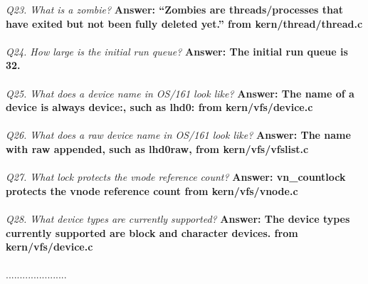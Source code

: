 \documentclass[11pt, english]{article}
\begin{document}
\textit{Q23. What is a zombie?}\newline
\textbf{Answer: “Zombies are threads/processes that have exited but not been fully deleted yet.”
	from kern/thread/thread.c
	}\\ \\
\textit{Q24. How large is the initial run queue?}\newline
\textbf{Answer: The initial run queue is 32.}\\ \\
\textit{Q25. What does a device name in OS/161 look like?}\newline
\textbf{Answer: The name of a device is always device:, such as lhd0:
	from kern/vfs/device.c
	}\\ \\
\textit{Q26. What does a raw device name in OS/161 look like?}\newline
\textbf{Answer: The name with raw appended, such as lhd0raw,
	from kern/vfs/vfslist.c 
	}\\ \\
\textit{Q27. What lock protects the vnode reference count?}\newline
\textbf{Answer: vn\_countlock protects the vnode reference count from kern/vfs/vnode.c
		}\\ \\
\textit{Q28. What device types are currently supported?}\newline
\textbf{Answer: The device types currently supported are block and character devices.
	from kern/vfs/device.c
	}\\ \\
......................
\end{document}
